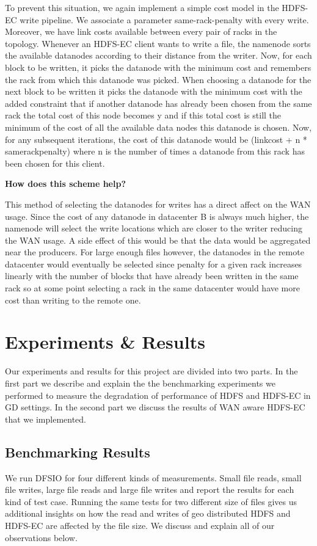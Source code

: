\documentclass{sig-alternate-05-2015}
\begin{document}
To prevent this situation, we again implement a simple cost model in the HDFS-EC write pipeline. We associate a parameter same-rack-penalty with every write. Moreover, we have link costs available between every pair of racks in the topology. Whenever an HDFS-EC client wants to write a file, the namenode sorts the available datanodes according to their distance from the writer. Now, for each block to be written, it picks the datanode with the minimum cost and remembers the rack from which this datanode was picked. When choosing a datanode for the next block to be written it picks the datanode with the minimum cost with the added constraint that if another datanode has already been chosen from the same rack the total cost of this node becomes y and if this total cost is still the minimum of the cost of all the available data nodes this  datanode is chosen. Now, for any subsequent iterations, the cost of this datanode would be (linkcost + n * samerackpenalty) where n is the number of times a datanode from this rack has been chosen for this client. 

\textbf{How does this scheme help?}

This method of selecting the datanodes for writes has a direct affect on the WAN usage. Since the cost of any datanode in datacenter B is always much higher, the namenode will select the write locations which are closer to the writer reducing the WAN usage. A side effect of this would be that the data would be aggregated near the producers.  For large enough files however, the datanodes in the remote datacenter would eventually be selected since penalty for a given rack increases linearly with the number of blocks that have already been written in the same rack so at some point selecting a rack in the same datacenter would have more cost than writing to the remote one. 

\section{Experiments \& Results}

Our experiments and results for this project are divided into two parts. In the first part we describe and explain the the benchmarking experiments we performed to measure the degradation of performance of HDFS and HDFS-EC in GD settings. In the second part we discuss the results of WAN aware HDFS-EC that we implemented.
\subsection{Benchmarking Results}
We run DFSIO for four different kinds of measurements. Small file reads, small file writes, large file reads and large file writes and report the results for each kind of test case. Running the same tests for two different size of  files gives us additional insights on how the read and writes of geo distributed HDFS and HDFS-EC are affected by the file size. We discuss and explain all of our observations below. 
\end{document}
